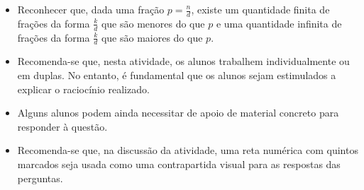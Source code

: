 \begin{atividade}\label{chap4-ativ12}
\objetivos
\begin{itemize} %
    \item       Reconhecer que, dada uma fração       $p = \frac{n}{d}$, existe
um quantidade finita de frações da forma       $\frac{k}{d}$       que são
menores do que       $p$       e uma quantidade infinita de frações da forma
  $\frac{k}{d}$       que são maiores do que       $p$.
\end{itemize} %

\discussoes
\begin{itemize} %
    \item       Recomenda-se que, nesta atividade, os alunos trabalhem
individualmente ou em duplas. No entanto, é fundamental que os alunos sejam
estimulados a explicar o raciocínio realizado.
    \item       Alguns alunos podem ainda necessitar de apoio de material
concreto para responder à questão.
    \item       Recomenda-se que, na discussão da atividade, uma reta numérica
com quintos marcados seja usada como uma contrapartida visual para as respostas
das perguntas.
\end{itemize} %


\noindent 
\begin{center}
\end{center}


\end{atividade}
